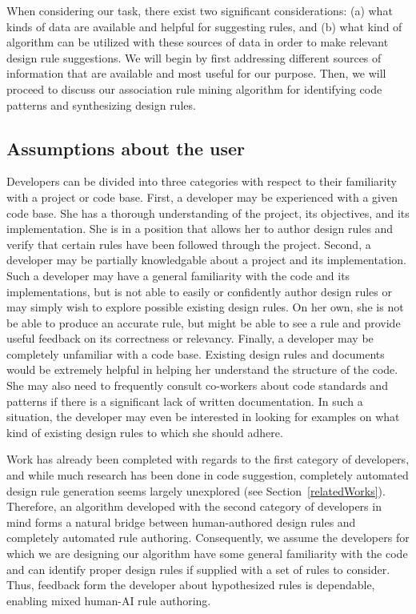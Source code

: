 \documentclass[12pt]{article}
\begin{document}
When considering our task, there exist two significant considerations: (a) what kinds of data are available and helpful for suggesting rules, and (b) what kind of algorithm can be utilized with these sources of data in order to make relevant design rule suggestions. We will begin by first addressing different sources of information that are available and most useful for our purpose. Then, we will proceed to discuss our association rule mining algorithm for identifying code patterns and synthesizing design rules.

\subsection{Assumptions about the user} \label{assumptions}

Developers can be divided into three categories with respect to their familiarity with a project or code base. First, a developer may be experienced with a given code base. She has a thorough understanding of the project, its objectives, and its implementation. She is in a position that allows her to author design rules and verify that certain rules have been followed through the project. Second, a developer may be partially knowledgable about a project and its implementation. Such a developer may have a general familiarity with the code and its implementations, but is not able to easily or confidently author design rules or may simply wish to explore possible existing design rules. On her own, she is not be able to produce an accurate rule, but might be able to see a rule and provide useful feedback on its correctness or relevancy. Finally, a developer may be completely unfamiliar with a code base. Existing design rules and documents would be extremely helpful in helping her understand the structure of the code. She may also need to frequently consult co-workers about code standards and patterns if there is a significant lack of written documentation. In such a situation, the developer may even be interested in looking for examples on what kind of existing design rules to which she should adhere.

Work has already been completed with regards to the first category of developers, and while much research has been done in code suggestion, completely automated design rule generation seems largely unexplored (see Section~\ref{relatedWorks}). Therefore, an algorithm developed with the second category of developers in mind forms a natural bridge between human-authored design rules and completely automated rule authoring. Consequently, we assume the developers for which we are designing our algorithm have some general familiarity with the code and can identify proper design rules if supplied with a set of rules to consider. Thus, feedback form the developer about hypothesized rules is dependable, enabling mixed human-AI rule authoring.
\end{document}
